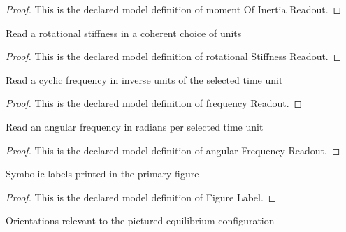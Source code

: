 \begin{proof}
  This is the declared model definition of moment Of Inertia Readout.
\end{proof}
\begin{definition}
  \label{def:physics:phyx-mini-0233:phyxminiproblems-problemphyxmini0233-rotationalstiffnessreadout}
  Read a rotational stiffness in a coherent choice of units
\end{definition}
\begin{proof}
  This is the declared model definition of rotational Stiffness Readout.
\end{proof}
\begin{definition}
  \label{def:physics:phyx-mini-0233:phyxminiproblems-problemphyxmini0233-frequencyreadout}
  Read a cyclic frequency in inverse units of the selected time unit
\end{definition}
\begin{proof}
  This is the declared model definition of frequency Readout.
\end{proof}
\begin{definition}
  \label{def:physics:phyx-mini-0233:phyxminiproblems-problemphyxmini0233-angularfrequencyreadout}
  Read an angular frequency in radians per selected time unit
\end{definition}
\begin{proof}
  This is the declared model definition of angular Frequency Readout.
\end{proof}
\begin{definition}
  \label{def:physics:phyx-mini-0233:phyxminiproblems-problemphyxmini0233-figurelabel}
  Symbolic labels printed in the primary figure
\end{definition}
\begin{proof}
  This is the declared model definition of Figure Label.
\end{proof}
\begin{definition}[Orientation]
  \label{def:physics:phyx-mini-0233:phyxminiproblems-problemphyxmini0233-orientation}
  Orientations relevant to the pictured equilibrium configuration
\end{definition}
